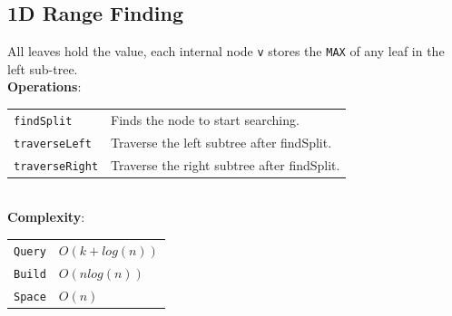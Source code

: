 \documentclass[10pt,landscape,a4paper]{article}
\begin{document}
\begin{multicols*}{4}
\subsection{1D Range Finding}
All leaves hold the value, each internal node \texttt{v} stores the \texttt{MAX} of any leaf in the left sub-tree. \\
\textbf{Operations}: \\
\begin{tabular}{p{2cm} p{3.5cm}}
    \verb!findSplit!        & Finds the node to start searching. \\
    \verb!traverseLeft!     & Traverse the left subtree after findSplit. \\
    \verb!traverseRight!    & Traverse the right subtree after findSplit.\\
\end{tabular}\\
\textbf{Complexity}: \\
\begin{tabular}{p{2cm} p{3.5cm}}    
    \verb!Query!    & $O(k + log(n))$ \\
    \verb!Build!    & $O(nlog(n))$ \\
    \verb!Space!    & $O(n)$ \\
\end{tabular}

\end{multicols*}
\end{document}
